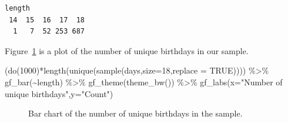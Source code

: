 \documentclass[
  letterpaper,
  DIV=11,
  numbers=noendperiod]{scrreprt}
\newenvironment{Shaded}{\begin{snugshade}}{\end{snugshade}}
\newcommand{\AttributeTok}[1]{\textcolor[rgb]{0.40,0.45,0.13}{#1}}
\newcommand{\ConstantTok}[1]{\textcolor[rgb]{0.56,0.35,0.01}{#1}}
\newcommand{\DecValTok}[1]{\textcolor[rgb]{0.68,0.00,0.00}{#1}}
\newcommand{\FunctionTok}[1]{\textcolor[rgb]{0.28,0.35,0.67}{#1}}
\newcommand{\NormalTok}[1]{\textcolor[rgb]{0.00,0.23,0.31}{#1}}
\newcommand{\SpecialCharTok}[1]{\textcolor[rgb]{0.37,0.37,0.37}{#1}}
\newcommand{\StringTok}[1]{\textcolor[rgb]{0.13,0.47,0.30}{#1}}
\begin{document}
\begin{verbatim}
length
 14  15  16  17  18 
  1   7  52 253 687 
\end{verbatim}

Figure~\ref{fig-bar71} is a plot of the number of unique birthdays in
our sample.

\begin{Shaded}
\begin{Highlighting}[]
\NormalTok{(}\FunctionTok{do}\NormalTok{(}\DecValTok{1000}\NormalTok{)}\SpecialCharTok{*}\FunctionTok{length}\NormalTok{(}\FunctionTok{unique}\NormalTok{(}\FunctionTok{sample}\NormalTok{(days,}\AttributeTok{size=}\DecValTok{18}\NormalTok{,}\AttributeTok{replace =} \ConstantTok{TRUE}\NormalTok{)))) }\SpecialCharTok{\%\textgreater{}\%}
  \FunctionTok{gf\_bar}\NormalTok{(}\SpecialCharTok{\textasciitilde{}}\NormalTok{length) }\SpecialCharTok{\%\textgreater{}\%}
  \FunctionTok{gf\_theme}\NormalTok{(}\FunctionTok{theme\_bw}\NormalTok{()) }\SpecialCharTok{\%\textgreater{}\%}
  \FunctionTok{gf\_labs}\NormalTok{(}\AttributeTok{x=}\StringTok{"Number of unique birthdays"}\NormalTok{,}\AttributeTok{y=}\StringTok{"Count"}\NormalTok{)}
\end{Highlighting}
\end{Shaded}

\begin{figure}[H]


\caption{\label{fig-bar71}Bar chart of the number of unique birthdays in
the sample.}

\end{figure}%
\end{document}
